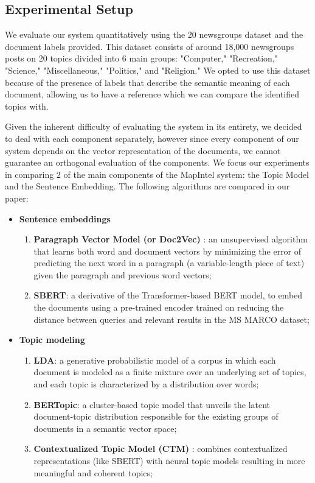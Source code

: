 \documentclass[a4paper]{article}
\begin{document}
\subsection{Experimental Setup}
We evaluate our system quantitatively using the 20 newsgroups \citep{pedregosa2011} dataset and the document labels provided. This dataset consists of around 18,000 newsgroups posts on 20 topics divided into 6 main groups: "Computer," "Recreation," "Science," "Miscellaneous," "Politics," and "Religion." We opted to use this dataset because of the presence of labels that describe the semantic meaning of each document, allowing us to have a reference which we can compare the identified topics with.

Given the inherent difficulty of evaluating the system in its entirety, we decided to deal with each component separately, however since every component of our system depends on the vector representation of the documents, we cannot guarantee an orthogonal evaluation of the components. We focus our experiments in comparing 2 of the main components of the MapIntel system: the Topic Model and the Sentence Embedding. The following algorithms are compared in our paper:
\begin{itemize}
	\item \textbf{Sentence embeddings}
	      \begin{enumerate}
		      \item \textbf{Paragraph Vector Model (or Doc2Vec)} \citep{le2014}: an unsupervised algorithm that learns both word and document vectors by minimizing the error of predicting the next word in a paragraph (a variable-length piece of text) given the paragraph and previous word vectors;
		      \item \textbf{SBERT}: a derivative of the Transformer-based BERT model, to embed the documents using a pre-trained encoder trained on reducing the distance between queries and relevant results in the MS MARCO dataset;
	      \end{enumerate}
	\item \textbf{Topic modeling}
	      \begin{enumerate}
		      \item \textbf{LDA}: a generative probabilistic model of a corpus in which each document is modeled as a finite mixture over an underlying set of topics, and each topic is characterized by a distribution over words;
		      \item \textbf{BERTopic}: a cluster-based topic model that unveils the latent document-topic distribution responsible for the existing groups of documents in a semantic vector space;
		      \item \textbf{Contextualized Topic Model (CTM)} \citep{bianchi2021}: combines contextualized representations (like SBERT) with neural topic models resulting in more meaningful and coherent topics;
	      \end{enumerate}
\end{itemize}
\end{document}
